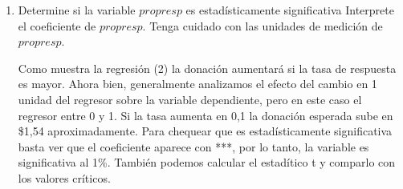 \documentclass[10pt,a4paper]{article}
\begin{document}
\begin{enumerate}
\item Determine si la variable $propresp$ es estadísticamente significativa  Interprete el coeficiente de $propresp$. Tenga cuidado con las unidades de medición
de $propresp$.

{\color{blue} Como muestra la regresión (2) la donación aumentará si la tasa de respuesta es mayor. Ahora bien, generalmente analizamos el efecto del cambio en 1 unidad del regresor sobre la variable dependiente, pero en este caso el regresor entre 0 y 1. Si la tasa aumenta en 0,1 la donación esperada sube en \$1,54 aproximadamente. Para chequear que es estadísticamente significativa basta ver que el coeficiente aparece con ***, por lo tanto, la variable  es  significativa al 1\%. También podemos calcular el estadítico t y comparlo con los valores críticos.}
\end{enumerate}
 
\end{document}
